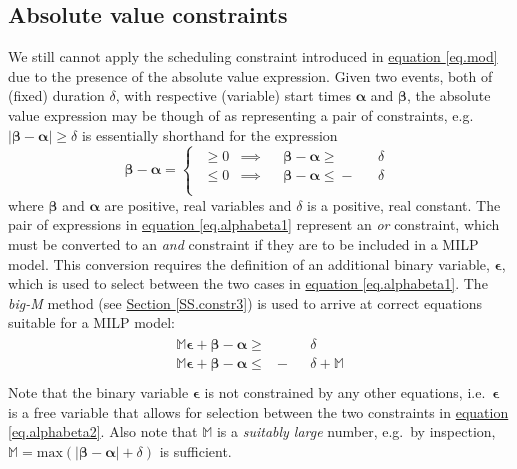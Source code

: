 \subsection{Absolute value constraints}\label{SS.absval}
We still cannot apply the scheduling constraint introduced in
\hyperref[eq.mod]{equation \ref*{eq.mod}} due to the presence of the absolute
value expression.
Given two events, both of (fixed) duration $\delta$, with respective (variable)
start times $\boldsymbol{\alpha}$ and $\boldsymbol{\beta}$, the absolute
value expression may be though of as representing a pair of constraints, e.g.\ 
$ \lvert \boldsymbol{\beta} - \boldsymbol{\alpha} \rvert \ge \delta $
is essentially shorthand for the expression
\begin{equation}
    \boldsymbol{\beta} - \boldsymbol{\alpha} = 
    \begin{cases}
        \begin{alignedat}{6}
            \ge{} 0 &\implies &&\boldsymbol{\beta} {}-{} \boldsymbol{\alpha}
            {}\ge{} &&\delta\\
            \le{} 0 &\implies &&\boldsymbol{\beta} {}-{} \boldsymbol{\alpha}
            {}\le{} - &&\delta\\
        \end{alignedat}
    \end{cases}
    \label{eq.alphabeta1}
\end{equation}
where $\boldsymbol{\beta}$ and $\boldsymbol{\alpha}$ are positive, real
variables and $\delta$ is a positive, real constant.
The pair of expressions in 
\hyperref[eq.alphabeta1]{equation \ref*{eq.alphabeta1}}
represent an \emph{or} constraint, which must be converted to an \emph{and}
constraint if they are to be included in a MILP model.
This conversion requires the definition of an additional binary variable,
$\boldsymbol{\epsilon}$, which is used to select between the two cases in
\hyperref[eq.alphabeta1]{equation \ref*{eq.alphabeta1}}.
The \emph{big-M} method (see \hyperref[SS.constr3]{Section \ref*{SS.constr3}})
is used to arrive at correct equations suitable for a
MILP model:
\begin{equation}
    \begin{split}
        \begin{alignedat}{4}
            \mathbb{M} \boldsymbol{\epsilon} + \boldsymbol{\beta} 
            - \boldsymbol{\alpha} {}\ge{} & &&\delta\\
            \mathbb{M} \boldsymbol{\epsilon} + \boldsymbol{\beta}
            - \boldsymbol{\alpha} {}\le{} & - &&\delta {}+{} \mathbb{M}\\
        \end{alignedat}
    \end{split}
    \label{eq.alphabeta2}
\end{equation}
Note that the binary variable $\boldsymbol{\epsilon}$ is not constrained by any
other equations, i.e.\ $\boldsymbol{\epsilon}$ is a free variable that allows
for selection between the two constraints in
\hyperref[eq.alphabeta2]{equation \ref*{eq.alphabeta2}}.
Also note that $\mathbb{M}$ is a \emph{suitably large} number, e.g.\ by 
inspection,
$\mathbb{M} =  \text{max} \left(|\boldsymbol{\beta} - \boldsymbol{\alpha}|
 + \delta \right)$ is sufficient.

